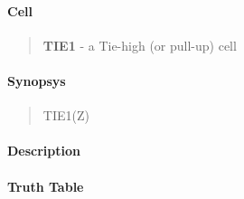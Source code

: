 \label{TIE1}
\paragraph{Cell}
\begin{quote}
    \textbf{TIE1} - a Tie-high (or pull-up) cell 
\end{quote}

\paragraph{Synopsys}
\begin{quote}
    TIE1(Z)
\end{quote}

\paragraph{Description}

%

\paragraph{Truth Table}


